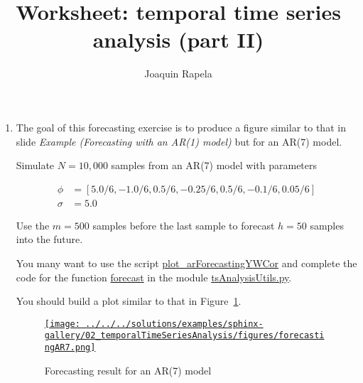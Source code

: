 \documentclass[12pt]{article}
\title{Worksheet: temporal time series analysis (part II)}
\author{Joaquin Rapela}
\begin{document}
\maketitle

\begin{enumerate}

    \item The goal of this forecasting exercise is to produce a figure similar
        to that in slide \emph{Example (Forecasting with an AR(1) model)} but
        for an AR(7) model.

        Simulate $N=10,000$ samples from an AR(7) model with parameters

        \begin{align*}
            \phi&=[5.0/6,-1.0/6,0.5/6,-0.25/6,0.5/6,-0.1/6,0.05/6]\\
            \sigma&=5.0
        \end{align*}


        \noindent Use the $m=500$ samples before the last sample to forecast $h=50$ samples into
        the future.

        You many want to use the script
        \href{https://github.com/joacorapela/statNeuro2025/blob/master/worksheets/02\_temporalTimeSeriesAnalysis/plot\_arForecastingYWCor.py}{plot\_arForecastingYWCor}
        and complete the code for the function
        \href{https://github.com/joacorapela/statNeuro2025/blob/6cfd79b15e698f4522eec97017f5471a4ff67633/worksheets/02\_temporalTimeSeriesAnalysis/tsAnalysisUtils.py\#L53}{forecast}
        in the module
        \href{https://github.com/joacorapela/statNeuro2025/blob/master/worksheets/02\_temporalTimeSeriesAnalysis/tsAnalysisUtils.py}{tsAnalysisUtils.py}.

        You should build a plot similar to that in
        Figure~\ref{fig:forecasting}.

        \begin{figure}
            \begin{center}
                \href{}{\texttt{[image: ../../../solutions/examples/sphinx-gallery/02\_temporalTimeSeriesAnalysis/figures/forecastingAR7.png]}}
            \end{center}
            \caption{Forecasting result for an AR(7) model}
            \label{fig:forecasting}
        \end{figure}


\end{enumerate}
\end{document}

